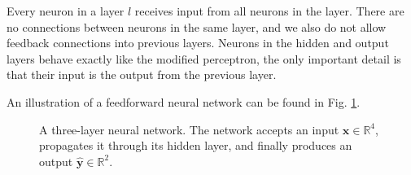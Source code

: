 Every neuron in a layer $l$ receives input from all neurons in the  layer. There are no connections between neurons in the same layer, and we also do not allow feedback connections into previous layers. Neurons in the hidden and output layers behave exactly like the modified perceptron, the only important detail is that their input is the output from the previous layer.

An illustration of a feedforward neural network can be found in Fig. \ref{fig:network}.

\begin{figure}
	\begin{center}
		
	\end{center}
	\caption{A three-layer neural network. The network accepts an input $\bm{x} \in \mathbb{R}^4$, propagates it through its hidden layer, and finally produces an output $\hat{\bm{y}} \in \mathbb{R}^2$.}
	\label{fig:network}
\end{figure}